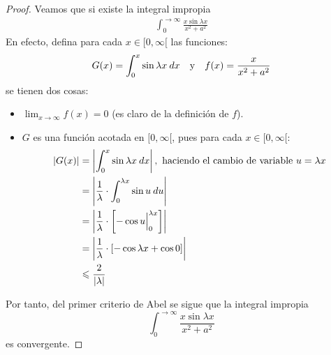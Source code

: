 \documentclass[12pt]{report}
\newcounter{it}
\theoremstyle{largebreak}
\renewcommand{\leq}{\ensuremath{\leqslant}}
\newcommand\abs[1]{\ensuremath{\left|#1\right|}}
\begin{document}
\begin{proof}
        Veamos que si existe la integral impropia
        \begin{equation*}
            \begin{split}
                \int_{ 0}^{\rightarrow\infty}\frac{x\sin\lambda x}{x^2+a^2}
            \end{split}
        \end{equation*}
        En efecto, defina para cada $x\in[0,\infty[$ las funciones:
        \begin{equation*}
            G(x)=\int_{ 0}^x \sin\lambda x\:dx\quad\textup{y}\quad f(x)=\frac{x}{x^2+a^2}
        \end{equation*}
        se tienen dos cosas:
        \begin{itemize}
            \item $\lim_{x\rightarrow\infty}f(x)=0$ (es claro de la definición de $f$).
            \item $G$ es una función acotada en $[0,\infty[$, pues para cada $x\in[0,\infty[$:
            \begin{equation*}
                \begin{split}
                    \abs{G(x)}&=\abs{\int_{ 0}^x \sin\lambda x\:dx},\textup{ haciendo el cambio de variable }u=\lambda x\\
                    &=\abs{\frac{1}{\lambda}\cdot \int_{ 0}^{\lambda x}\sin u\:du}\\
                    &=\abs{\frac{1}{\lambda}\cdot\left[-\cos u\Big|_{ 0}^{\lambda x} \right]}\\
                    &=\abs{\frac{1}{\lambda}\cdot\left[-\cos \lambda x+\cos 0\right]}\\
                    &\leq\frac{2}{\abs{\lambda}}
                \end{split}
            \end{equation*}
        \end{itemize}
        Por tanto, del primer criterio de Abel se sigue que la integral impropia
        \begin{equation*}
            \int_{ 0}^{\rightarrow\infty}\frac{x\sin\lambda x}{x^2+a^2}
        \end{equation*}
        es convergente.


\end{proof}
\end{document}
